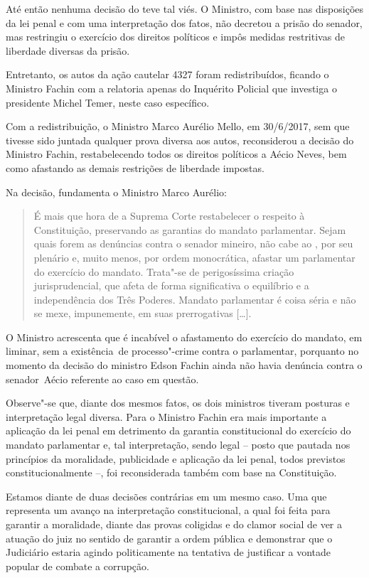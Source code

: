 Até então nenhuma decisão do  teve tal viés. O Ministro, com base nas
disposições da lei penal e com uma interpretação dos fatos, não decretou
a prisão do senador, mas restringiu o exercício dos direitos políticos e
impôs medidas restritivas de liberdade diversas da prisão.

Entretanto, os autos da ação cautelar 4327 foram redistribuídos, ficando
o Ministro Fachin com a relatoria apenas do Inquérito Policial que
investiga o presidente Michel Temer, neste caso específico.

Com a redistribuição, o Ministro Marco Aurélio Mello, em 30/6/2017, sem
que tivesse sido juntada qualquer prova diversa aos autos, reconsiderou
a decisão do Ministro Fachin, restabelecendo todos os direitos políticos
a Aécio Neves, bem como afastando as demais restrições de liberdade
impostas.

Na decisão, fundamenta o Ministro Marco Aurélio:

\begin{quote}
É mais que hora de a Suprema Corte restabelecer o respeito à
Constituição, preservando as garantias do mandato parlamentar. Sejam
quais forem as denúncias contra o senador mineiro, não cabe ao , por
seu plenário e, muito menos, por ordem monocrática, afastar um
parlamentar do exercício do mandato. Trata"-se de perigosíssima criação
jurisprudencial, que afeta de forma significativa o equilíbrio e a
independência dos Três Poderes. Mandato parlamentar é coisa séria e não
se mexe, impunemente, em suas prerrogativas [\ldots{}].
\end{quote}

O Ministro acrescenta que é incabível o afastamento do exercício do
mandato, em liminar, sem a existência~de processo"-crime contra o
parlamentar, porquanto no momento da decisão do ministro Edson Fachin
ainda não havia denúncia contra o senador~Aécio referente ao caso em
questão.

Observe"-se que, diante dos mesmos fatos, os dois ministros tiveram
posturas e interpretação legal diversa. Para o Ministro Fachin
era mais importante a aplicação da lei penal em detrimento da garantia
constitucional do exercício do mandato parlamentar e, tal interpretação,
sendo legal -- posto que pautada nos princípios da moralidade,
publicidade e aplicação da lei penal, todos previstos
constitucionalmente --, foi reconsiderada também com base na Constituição.

Estamos diante de duas decisões contrárias em um mesmo caso. Uma que
representa um avanço na interpretação constitucional, a qual foi feita
para garantir a moralidade, diante das provas coligidas e do clamor
social de ver a atuação do juiz no sentido de garantir a ordem pública e
demonstrar que o Judiciário estaria agindo politicamente na tentativa de
justificar a vontade popular de combate a corrupção.

